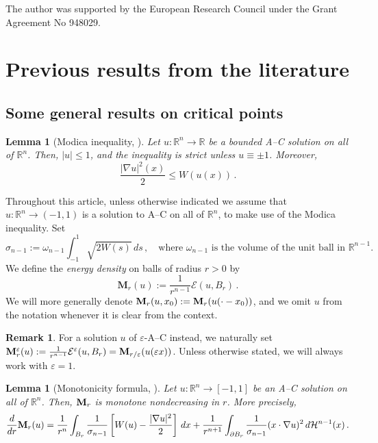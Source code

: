 \documentclass{article}
\newcommand{\R}{\mathbb{R}}
\newcommand{\cH}{\mathcal{H}}
\newcommand{\ep}{\varepsilon}
\newtheorem{lemma}[theorem]{Lemma}
\theoremstyle{definition}
\newtheorem{remark}[theorem]{Remark}
\begin{document}
The author was supported by the European Research Council under the Grant Agreement No 948029. 

\section{Previous results from the literature}
\subsection{Some general results on critical points}
\begin{lemma}[Modica inequality, \cite{Modica85}]\label{lem:modicaineq}
Let $u:\R^n\to\R$ be a bounded A--C solution on all of $\R^n$. Then, $|u|\leq 1$, and the inequality is strict unless $u\equiv\pm 1$. Moreover,
    $$\frac{|\nabla u|^2(x)}{2}\leq W(u(x))\,.$$
\end{lemma}
Throughout this article, unless otherwise indicated we assume that $u:\R^n\to(-1,1)$ is a solution to A--C on all of $\R^n$, to make use of the Modica inequality. Set
\begin{equation}\label{eq:sig(n-1
)def}
    \sigma_{n-1}:=\omega_{n-1}\int_{-1}^1 \sqrt{2 W(s)}\,ds\,,\quad\mbox{where } \omega_{n-1}\mbox{ is the volume of the unit ball in } \R^{n-1}.
\end{equation}
We define the \emph{energy density} on balls of radius $r > 0$ by
\begin{equation}\label{eq:densitydef}
    \mathbf{M}_r(u) := \frac{1}{r^{n-1}} \mathcal{E}(u, B_r)\,.
\end{equation}
We will more generally denote ${\bf M}_r(u,x_0):={\bf M}_r(u(\cdot-x_0))$, and we omit $u$ from the notation whenever it is clear from the context.
    \begin{remark}\label{rmk:rescdens}
    For a solution $u$ of $\ep$-A--C instead, we naturally set ${\bf M}_r^\ep(u):=\frac{1}{r^{n-1}}\mathcal E^\ep(u,B_r)={\bf M}_{r/\ep}(u(\ep x))$. Unless otherwise stated, we will always work with $\ep=1$.
\end{remark}
\begin{lemma}[Monotonicity formula, \cite{Modica85b}]\label{lem:monformula}
    Let $u:\R^n\to[-1,1]$ be an A--C solution on all of $\R^n$. Then, ${\bf M}_r$ is monotone nondecreasing in $r$. More precisely,
    \begin{equation}\label{eq:monfor}
        \frac{d}{dr}{\bf M}_r(u)=\frac{1}{r^n}\int_{B_r}\frac{1}{\sigma_{n-1}}\left[W(u)-\frac{|\nabla u|^2}{2}\right]\,dx+\frac{1}{r^{n+1}}\int_{\partial B_r}\frac{1}{\sigma_{n-1}}(x\cdot\nabla u)^2\,d\cH^{n-1}(x)\,.
    \end{equation}
\end{lemma}
\end{document}
